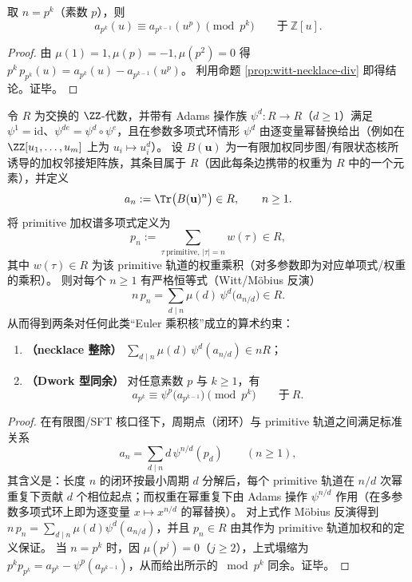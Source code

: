 \begin{corollary}\label{cor:witt-dwork-congruence}
取 $n=p^k$（素数 $p$），则
\[
a_{p^k}(u)\equiv a_{p^{k-1}}(u^p)\pmod{p^k}\qquad\text{于}\ \mathbb{Z}[u].
\]
\end{corollary}
\begin{proof}
由 $\mu(1)=1,\mu(p)=-1,\mu(p^2)=0$ 得
\(
p^k\,p_{p^k}(u)=a_{p^k}(u)-a_{p^{k-1}}(u^p)
\)。
利用命题 \ref{prop:witt-necklace-div} 即得结论。证毕。
\end{proof}



\begin{proposition}\label{prop:witt-necklace-dwork-R}
令 \(R\) 为交换的 \(\ZZ\)-代数，并带有 Adams 操作族 \(\psi^d:R\to R\)（\(d\ge 1\)）满足
\(\psi^1=\mathrm{id}\)、\(\psi^{de}=\psi^d\circ\psi^e\)，且在参数多项式环情形 \(\psi^d\) 由逐变量幂替换给出（例如在 \(\ZZ[u_1,\dots,u_m]\) 上为 \(u_i\mapsto u_i^d\)）。
设 \(B(\mathbf u)\) 为一有限加权同步图/有限状态核所诱导的加权邻接矩阵族，其条目属于 \(R\)（因此每条边携带的权重为 \(R\) 中的一个元素），并定义
\[
a_n:=\Tr\bigl(B(\mathbf u)^n\bigr)\in R,\qquad n\ge 1.
\]
将 primitive 加权谱多项式定义为
\[
p_n:=\sum_{\tau\ \mathrm{primitive},\,|\tau|=n} w(\tau)\in R,
\]
其中 \(w(\tau)\in R\) 为该 primitive 轨道的权重乘积（对多参数即为对应单项式/权重的乘积）。
则对每个 \(n\ge 1\) 有严格恒等式（Witt/Möbius 反演）
\[
n\,p_n=\sum_{d\mid n}\mu(d)\,\psi^d\!\bigl(a_{n/d}\bigr)\in R.
\]
从而得到两条对任何此类“Euler 乘积核”成立的算术约束：
\begin{enumerate}
  \item \textbf{（necklace 整除）} \(\sum_{d\mid n}\mu(d)\,\psi^d(a_{n/d})\in nR\)；
  \item \textbf{（Dwork 型同余）} 对任意素数 \(p\) 与 \(k\ge 1\)，有
  \[
  a_{p^k}\equiv \psi^{p}\!\bigl(a_{p^{k-1}}\bigr)\pmod{p^k}\qquad\text{于}\ R.
  \]
\end{enumerate}
\end{proposition}
\begin{proof}
在有限图/SFT 核口径下，周期点（闭环）与 primitive 轨道之间满足标准关系
\[
a_n=\sum_{d\mid n} d\,\psi^{n/d}(p_d)\qquad(n\ge 1),
\]
其含义是：长度 \(n\) 的闭环按最小周期 \(d\) 分解后，每个 primitive 轨道在 \(n/d\) 次幂重复下贡献 \(d\) 个相位起点；而权重在幂重复下由 Adams 操作 \(\psi^{n/d}\) 作用（在多参数多项式环上即为逐变量 \(x\mapsto x^{n/d}\) 的幂替换）。
对上式作 Möbius 反演得到
\(
n\,p_n=\sum_{d\mid n}\mu(d)\psi^d(a_{n/d})
\)，并且 \(p_n\in R\) 由其作为 primitive 轨道加权和的定义保证。
当 \(n=p^k\) 时，因 \(\mu(p^j)=0\)（\(j\ge 2\)），上式塌缩为
\(
p^k p_{p^k}=a_{p^k}-\psi^{p}(a_{p^{k-1}})
\)，从而给出所示的 \(\bmod p^k\) 同余。证毕。
\end{proof}

